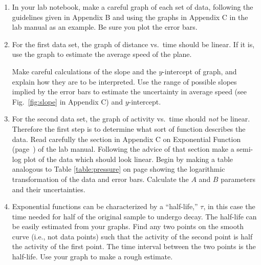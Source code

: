 \begin{enumerate}
\item In your lab notebook, make a careful graph of each set of
        data, following the guidelines given in
        Appendix B  and using the graphs in
        Appendix C  in the lab
        manual as an example.  Be sure
        you plot the error bars.
\item For the first data set, the graph of distance vs.\ time
        should be linear.  If it is, use the graph to estimate
        the average speed of the plane.

        Make careful calculations of the slope and the $y$-intercept
        of graph, and explain how they are to be interpreted.
        Use the range of
        possible slopes implied by the error bars to estimate the
        uncertainty in average speed (see Fig.~\ref{fig:slope} in
Appendix C) and $y$-intercept. %
\item For the second data set, the graph of activity vs.\ time
        should {\em not} be linear.  Therefore the first step is to
        determine what sort of function describes the data.  Read
        carefully the section in Appendix C on Exponential Function
        (page~\pageref{exprel}) of the lab manual.  Following
        the advice of that section make a semi-log plot of the
        data which should look linear.  Begin by making a table analogous to 
Table \ref{table:pressure} on page
\pageref{table:pressure} showing the logarithmic transformation of the data and error
bars.
Calculate the $A$ and $B$
        parameters and their uncertainties.



%
\item   Exponential functions can be characterized by a ``half-life,'' $\tau$,
        in this case the time
        needed for half of the original sample to undergo decay.
The half-life can be easily estimated from your graphs.  Find
any two points on the smooth curve (i.e., not data points) such that the activity 
of the second point
is half the activity of the first point.  The time interval between
the two points is the half-life.  Use your graph to make a rough estimate.


\end{enumerate}
